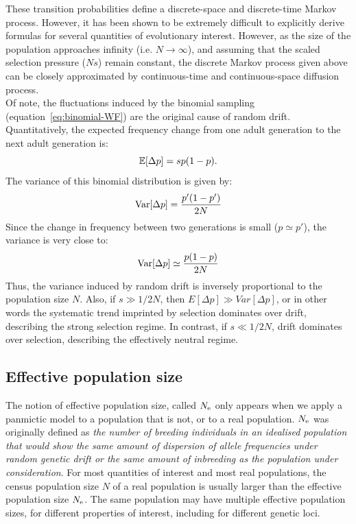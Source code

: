 These {transition} probabilities define a discrete-space and discrete-time Markov process.
However, it has been shown to be extremely difficult to explicitly derive formulas for several quantities of evolutionary interest.
However, as the size of the population approaches infinity (i.e. $ N \to \infty$), and assuming that the scaled selection pressure ($N s $) remain constant, the discrete Markov process given above can be closely approximated by continuous-time and continuous-space diffusion process.\\

Of note, the fluctuations induced by the binomial sampling (equation~\ref{eq:binomial-WF}) are the original cause of random drift.
Quantitatively, the expected frequency change from one adult generation to the next adult generation is:
\begin{equation}
    \operatorname{\mathbb{E}}[\Delta p] = s p (1-p).
\end{equation}
The variance of this binomial distribution is given by:
\begin{equation}
    \operatorname{\textrm{Var}}[\Delta p] = \frac{p' (1-p')}{2N}
\end{equation}
Since the change in frequency between two generations is small ($p \simeq p'$), the variance is very close to:
\begin{equation}
    \operatorname{\textrm{Var}}[\Delta p] \simeq \frac{p(1-p)}{2N}
\end{equation}
Thus, the variance induced by random drift is inversely proportional to the population size $N$.
Also, if $s \gg 1/2N$, then $E[\Delta p] \gg Var[\Delta p]$, or in other words the systematic trend imprinted by selection dominates over drift, describing the strong selection regime.
In contrast, if $s \ll 1 / 2N$, drift dominates over selection, describing the effectively neutral regime.

\subsection{Effective population size}

The notion of effective population size, called $N_{\textrm{e}}$ only appears when we apply a panmictic model to a population that is not, or to a real population.
$N_{\textrm{e}}$ was originally defined as \textit{the number of breeding individuals in an idealised population that would show the same amount of dispersion of allele frequencies under random genetic drift or the same amount of inbreeding as the population under consideration}.
For most quantities of interest and most real populations, the census population size $N$ of a real population is usually larger than the effective population size $N_{\textrm{e}}$.
The same population may have multiple effective population sizes, for different properties of interest, including for different genetic loci.

